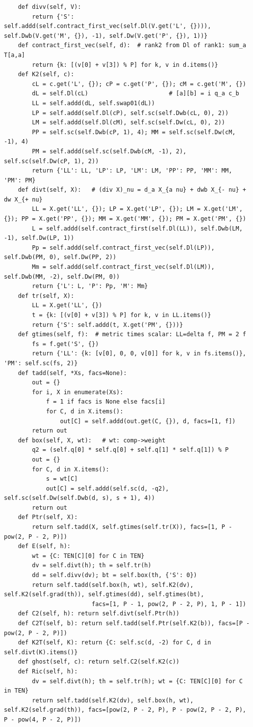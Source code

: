 \documentclass[10pt]{article}
\begin{document}
\begin{lstlisting}
    def divv(self, V):
        return {'S': self.addd(self.contract_first_vec(self.Dl(V.get('L', {}))), self.Dwb(V.get('M', {}), -1), self.Dw(V.get('P', {}), 1))}
    def contract_first_vec(self, d):  # rank2 from Dl of rank1: sum_a T[a,a]
        return {k: [(v[0] + v[3]) % P] for k, v in d.items()}
    def K2(self, c):
        cL = c.get('L', {}); cP = c.get('P', {}); cM = c.get('M', {})
        dL = self.Dl(cL)                       # [a][b] = i q_a c_b
        LL = self.addd(dL, self.swap01(dL))
        LP = self.addd(self.Dl(cP), self.sc(self.Dwb(cL, 0), 2))
        LM = self.addd(self.Dl(cM), self.sc(self.Dw(cL, 0), 2))
        PP = self.sc(self.Dwb(cP, 1), 4); MM = self.sc(self.Dw(cM, -1), 4)
        PM = self.addd(self.sc(self.Dwb(cM, -1), 2), self.sc(self.Dw(cP, 1), 2))
        return {'LL': LL, 'LP': LP, 'LM': LM, 'PP': PP, 'MM': MM, 'PM': PM}
    def divt(self, X):   # (div X)_nu = d_a X_{a nu} + dwb X_{- nu} + dw X_{+ nu}
        LL = X.get('LL', {}); LP = X.get('LP', {}); LM = X.get('LM', {}); PP = X.get('PP', {}); MM = X.get('MM', {}); PM = X.get('PM', {})
        L = self.addd(self.contract_first(self.Dl(LL)), self.Dwb(LM, -1), self.Dw(LP, 1))
        Pp = self.addd(self.contract_first_vec(self.Dl(LP)), self.Dwb(PM, 0), self.Dw(PP, 2))
        Mm = self.addd(self.contract_first_vec(self.Dl(LM)), self.Dwb(MM, -2), self.Dw(PM, 0))
        return {'L': L, 'P': Pp, 'M': Mm}
    def tr(self, X):
        LL = X.get('LL', {})
        t = {k: [(v[0] + v[3]) % P] for k, v in LL.items()}
        return {'S': self.addd(t, X.get('PM', {}))}
    def gtimes(self, f):  # metric times scalar: LL=delta f, PM = 2 f
        fs = f.get('S', {})
        return {'LL': {k: [v[0], 0, 0, v[0]] for k, v in fs.items()}, 'PM': self.sc(fs, 2)}
    def tadd(self, *Xs, facs=None):
        out = {}
        for i, X in enumerate(Xs):
            f = 1 if facs is None else facs[i]
            for C, d in X.items():
                out[C] = self.addd(out.get(C, {}), d, facs=[1, f])
        return out
    def box(self, X, wt):   # wt: comp->weight
        q2 = (self.q[0] * self.q[0] + self.q[1] * self.q[1]) % P
        out = {}
        for C, d in X.items():
            s = wt[C]
            out[C] = self.addd(self.sc(d, -q2), self.sc(self.Dw(self.Dwb(d, s), s + 1), 4))
        return out
    def Ptr(self, X):
        return self.tadd(X, self.gtimes(self.tr(X)), facs=[1, P - pow(2, P - 2, P)])
    def E(self, h):
        wt = {C: TEN[C][0] for C in TEN}
        dv = self.divt(h); th = self.tr(h)
        dd = self.divv(dv); bt = self.box(th, {'S': 0})
        return self.tadd(self.box(h, wt), self.K2(dv), self.K2(self.grad(th)), self.gtimes(dd), self.gtimes(bt),
                         facs=[1, P - 1, pow(2, P - 2, P), 1, P - 1])
    def C2(self, h): return self.divt(self.Ptr(h))
    def C2T(self, b): return self.tadd(self.Ptr(self.K2(b)), facs=[P - pow(2, P - 2, P)])
    def K2T(self, K): return {C: self.sc(d, -2) for C, d in self.divt(K).items()}
    def ghost(self, c): return self.C2(self.K2(c))
    def Ric(self, h):
        dv = self.divt(h); th = self.tr(h); wt = {C: TEN[C][0] for C in TEN}
        return self.tadd(self.K2(dv), self.box(h, wt), self.K2(self.grad(th)), facs=[pow(2, P - 2, P), P - pow(2, P - 2, P), P - pow(4, P - 2, P)])


\end{lstlisting}
\end{document}
